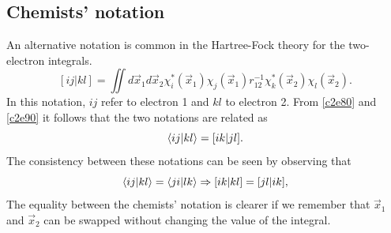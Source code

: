 \subsection{Chemists' notation}
An alternative notation is common in the Hartree-Fock theory for the two-electron
integrals.
\begin{equation}\label{c2e90}
[ij|kl] = \iint d\vec{x}_1d\vec{x}_2\chi_i^\ast(\vec{x}_1)\chi_j(\vec{x}_1)
r_{12}^{-1}\chi_k^\ast(\vec{x}_2)\chi_l(\vec{x}_2).
\end{equation}
In this notation, $ij$ refer to electron 1 and $kl$ to electron 2. From
\eqref{c2e80} and \eqref{c2e90} it follows that the two notations are related
as
\begin{equation}\label{c2e91}
\braket{ij|kl} = [ik|jl].
\end{equation}
The consistency between these notations can be seen by observing that
\begin{equation}\label{c2e92}
\braket{ij|kl} = \braket{ji|lk} \Rightarrow [ik|kl] = [jl|ik],
\end{equation}
The equality between the chemists' notation is clearer if we remember that
$\vec{x}_1$ and $\vec{x}_2$ can be swapped without changing the value of the
integral.

